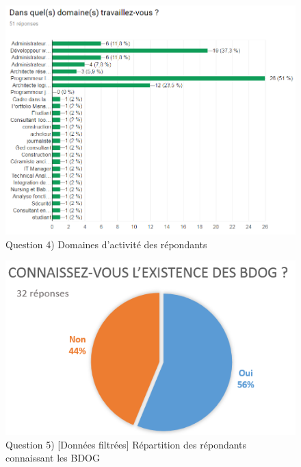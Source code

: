 \documentclass[a4paper,fleqn,12pt,oneside]{report}
\begin{document}
\begin{figure}[!ht]
\centering
\includegraphics[scale=.8]{figures/QProf.png}
\caption{Question 4) Domaines d'activité des répondants}
\label{fig:QProf}
\end{figure}

\newpage
{}

\begin{figure}[!ht]
\centering
\includegraphics[scale=1]{figures/QExistFilt.png}
\caption{Question 5) [Données filtrées] Répartition des répondants connaissant les BDOG}
\label{fig:QExistFilt}
\end{figure}
\end{document}
